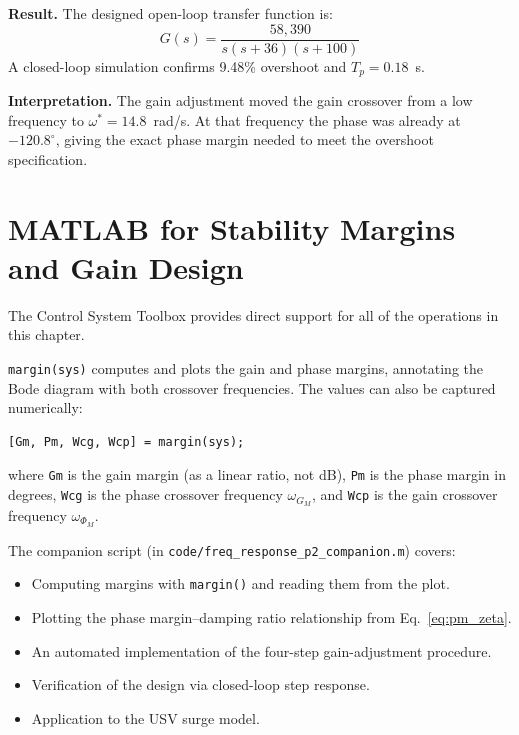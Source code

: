 \documentclass[12pt]{article}
\begin{document}
\textbf{Result.}  The designed open-loop transfer function is:
\begin{equation}
  G(s) = \frac{58{,}390}{s(s+36)(s+100)}
  \label{eq:ex2_result}
\end{equation}
A closed-loop simulation confirms 9.48\% overshoot and $T_p = 0.18$~s.

\medskip
\noindent\textbf{Interpretation.}  The gain adjustment moved the gain crossover
from a low frequency to $\omega^* = 14.8$~rad/s.  At that frequency the phase
was already at $-120.8^\circ$, giving the exact phase margin needed to meet
the overshoot specification.

\section{MATLAB for Stability Margins and Gain Design}
\label{sec:matlab}

The Control System Toolbox provides direct support for all of the operations in
this chapter.

\texttt{margin(sys)} computes and plots the gain and phase margins, annotating
the Bode diagram with both crossover frequencies.  The values can also be
captured numerically:
\begin{verbatim}
[Gm, Pm, Wcg, Wcp] = margin(sys);
\end{verbatim}
where \texttt{Gm} is the gain margin (as a linear ratio, not dB), \texttt{Pm}
is the phase margin in degrees, \texttt{Wcg} is the phase crossover frequency
$\omega_{G_M}$, and \texttt{Wcp} is the gain crossover frequency
$\omega_{\Phi_M}$.

The companion script (in \texttt{code/freq\_response\_p2\_companion.m}) covers:
\begin{itemize}
  \item Computing margins with \texttt{margin()} and reading them from the plot.
  \item Plotting the phase margin--damping ratio relationship from
    Eq.~\eqref{eq:pm_zeta}.
  \item An automated implementation of the four-step gain-adjustment procedure.
  \item Verification of the design via closed-loop step response.
  \item Application to the USV surge model.
\end{itemize}
\end{document}

